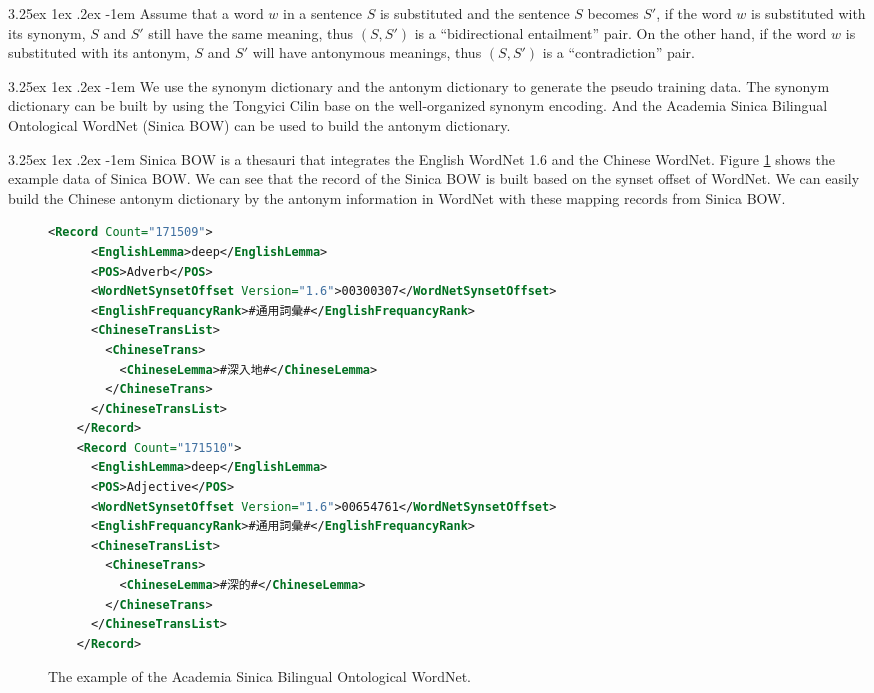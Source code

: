 \documentclass[12pt]{article}
\makeatletter
\renewcommand\paragraph{\@startsection{paragraph}{5}{\z@}%
  {3.25ex \@plus1ex \@minus.2ex}%
  {-1em}%
  {\normalfont\normalsize\bfseries}}
\makeatother
\begin{document}
\begin{CJK*}{UTF8}{bkai}
\begin{spacing}{1.77}
\paragraph{}
Assume that a word $w$ in a sentence $S$ is substituted and the sentence $S$ becomes $S'$, if the word $w$ is substituted with its synonym, $S$ and $S'$ still have the same meaning, thus $(S,S')$ is a ``bidirectional entailment'' pair. On the other hand, if the word $w$ is substituted with its antonym, $S$ and $S'$ will have antonymous meanings, thus $(S,S')$ is a ``contradiction'' pair.

\paragraph{}
We use the synonym dictionary and the antonym dictionary to generate the pseudo training data. The synonym dictionary can be built by using the Tongyici Cilin base on the well-organized synonym encoding. And the Academia Sinica Bilingual Ontological WordNet (Sinica BOW) \cite{huang2004sinica} can be used to build the antonym dictionary.

\paragraph{}
Sinica BOW is a thesauri that integrates the English WordNet 1.6 and the Chinese WordNet. Figure \ref{fig:bow} shows the example data of Sinica BOW. We can see that the record of the Sinica BOW is built based on the synset offset of WordNet. We can easily build the Chinese antonym dictionary by the antonym information in WordNet with these mapping records from Sinica BOW.

\begin{figure}
  \centering
  \caption{The example of the Academia Sinica Bilingual Ontological WordNet.}
  \begin{minipage}{\linewidth}
    \begin{lstlisting}[language=XML]
    <Record Count="171509">
      <EnglishLemma>deep</EnglishLemma>
      <POS>Adverb</POS>
      <WordNetSynsetOffset Version="1.6">00300307</WordNetSynsetOffset>
      <EnglishFrequancyRank>#通用詞彙#</EnglishFrequancyRank>
      <ChineseTransList>
        <ChineseTrans>
          <ChineseLemma>#深入地#</ChineseLemma>
        </ChineseTrans>
      </ChineseTransList>
    </Record>
    <Record Count="171510">
      <EnglishLemma>deep</EnglishLemma>
      <POS>Adjective</POS>
      <WordNetSynsetOffset Version="1.6">00654761</WordNetSynsetOffset>
      <EnglishFrequancyRank>#通用詞彙#</EnglishFrequancyRank>
      <ChineseTransList>
        <ChineseTrans>
          <ChineseLemma>#深的#</ChineseLemma>
        </ChineseTrans>
      </ChineseTransList>
    </Record>
    \end{lstlisting}
  \end{minipage}
  \label{fig:bow}
\end{figure}


\end{spacing}
\end{CJK*}
\end{document}

